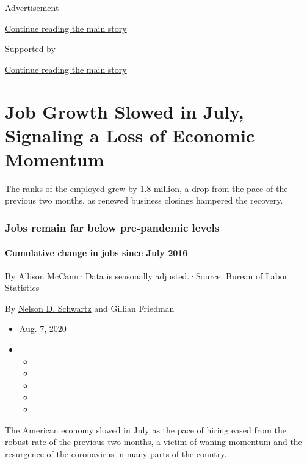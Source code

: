 Advertisement

\protect\hyperlink{after-top}{Continue reading the main story}

Supported by

\protect\hyperlink{after-sponsor}{Continue reading the main story}

\hypertarget{job-growth-slowed-in-july-signaling-a-loss-of-economic-momentum}{%
\section{Job Growth Slowed in July, Signaling a Loss of Economic
Momentum}\label{job-growth-slowed-in-july-signaling-a-loss-of-economic-momentum}}

The ranks of the employed grew by 1.8 million, a drop from the pace of
the previous two months, as renewed business closings hampered the
recovery.

\hypertarget{jobs-remain-far-below-pre-pandemic-levels}{%
\subsubsection{Jobs remain far below pre-pandemic
levels}\label{jobs-remain-far-below-pre-pandemic-levels}}

\hypertarget{cumulative-change-in-jobs-since-july-2016}{%
\paragraph{Cumulative change in jobs since July
2016}\label{cumulative-change-in-jobs-since-july-2016}}

By Allison McCann·Data is seasonally adjusted.·Source: Bureau of Labor
Statistics

By \href{https://www.nytimes.com/by/nelson-d-schwartz}{Nelson D.
Schwartz} and Gillian Friedman

\begin{itemize}
\item
  Aug. 7, 2020
\item
  \begin{itemize}
  \item
  \item
  \item
  \item
  \item
  \end{itemize}
\end{itemize}

The American economy slowed in July as the pace of hiring eased from the
robust rate of the previous two months, a victim of waning momentum and
the resurgence of the coronavirus in many parts of the country.

